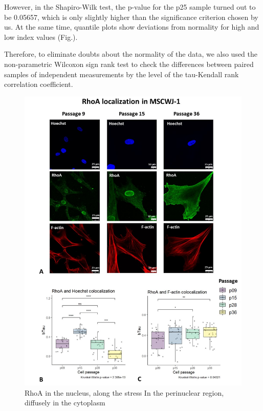\documentclass[english,authoryear]{elsarticle}
\begin{document}
However, in the Shapiro-Wilk test, the p-value for the p25 sample turned out to be 0.05657, which is only slightly higher than the significance criterion chosen by us. At the same time, quantile plots show deviations from normality for high and low index values (Fig.).

Therefore, to eliminate doubts about the normality of the data, we also used the non-parametric Wilcoxon sign rank test to check the differences between paired samples of independent measurements by the level of the tau-Kendall rank correlation coefficient.


\begin{figure}
  \includegraphics[width=0.9\linewidth]{fig_rho-actin-col.jpg}
  \caption{RhoA in the nucleus, along the stress In the perinuclear region, diffusely in the cytoplasm}
  \label{rho-actin-col}
  \centering
\end{figure}
\end{document}
